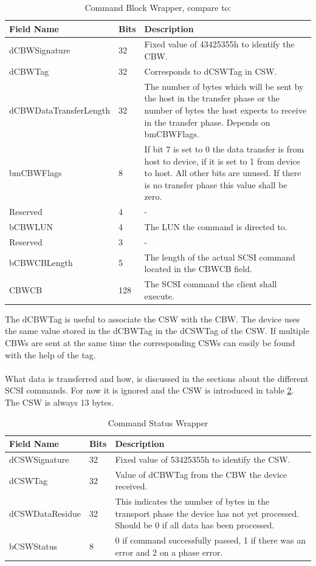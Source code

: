 \begin{table}[ht]
\caption{Command Block Wrapper, compare to: \cite{usb_ms_jan}}
\centering
\begin{tabular}{|l|l|p{9cm}|}
\hline\hline
\textbf{Field Name} & \textbf{Bits} & \textbf{Description}\\ \hline
dCBWSignature & 32 & Fixed value of 43425355h to identify the CBW. \\ \hline
dCBWTag & 32 & Corresponds to dCSWTag in CSW. \\ \hline
dCBWDataTransferLength & 32 & The number of bytes which will be sent by the host in the transfer phase or the number of bytes the host expects to receive in the transfer phase. Depends on bmCBWFlags. \\ \hline
bmCBWFlags & 8 & If bit 7 is set to 0 the data transfer is from host to device, if it is set to 1 from device to host. All other bits are unused. If there is no transfer phase this value shall be zero. \\ \hline
Reserved & 4 & - \\ \hline
bCBWLUN & 4 & The LUN the command is directed to. \\ \hline
Reserved & 3 & - \\ \hline
bCBWCBLength & 5 & The length of the actual SCSI command located in the CBWCB field. \\ \hline
CBWCB & 128 & The SCSI command the client shall execute. \\ \hline
\end{tabular}
\label{table:cbw}
\end{table}

The dCBWTag is useful to associate the CSW with the CBW. The device uses the same value stored in the dCBWTag in the dCSWTag of the CSW. If multiple CBWs are sent at the same time the corresponding CSWs can easily be found with the help of the tag.
\\\\
What data is transferred and how, is discussed in the sections about the different SCSI commands. For now it is ignored and the CSW is introduced in table \ref{table:csw}. The CSW is always 13 bytes.

\begin{table}[ht]
\caption{Command Status Wrapper \cite{usb_ms_jan}}
\centering
\begin{tabular}{|l|l|p{9cm}|}
\hline\hline
\textbf{Field Name} & \textbf{Bits} & \textbf{Description}\\ \hline
dCSWSignature & 32 & Fixed value of 53425355h to identify the CSW. \\ \hline
dCSWTag & 32 & Value of dCBWTag from the CBW the device received. \\ \hline
dCSWDataResidue & 32 & This indicates the number of bytes in the transport phase the device has not yet processed. Should be 0 if all data has been processed. \\ \hline
bCSWStatus & 8 & 0 if command successfully passed, 1 if there was an error and 2 on a phase error. \\ \hline
\end{tabular}
\label{table:csw}
\end{table}

